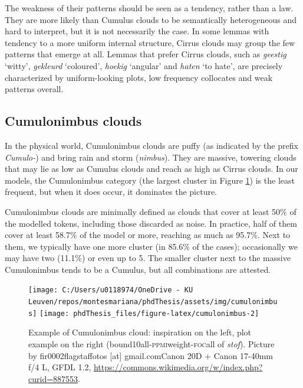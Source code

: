 \documentclass[
]{book}
\begin{document}
The weakness of their patterns should be seen as a tendency, rather than a law. They are more likely than Cumulus clouds to be semantically heterogeneous and hard to interpret, but it is not necessarily the case. In some lemmas with tendency to a more uniform internal structure, Cirrus clouds may group the few patterns that emerge at all.
Lemmas that prefer Cirrus clouds, such as \emph{geestig} `witty', \emph{gekleurd} `coloured', \emph{hoekig} `angular' and \emph{haten} `to hate', are precisely characterized by uniform-looking plots, low frequency collocates and weak patterns overall.

\hypertarget{cumulonimbus-clouds}{%
\subsection{Cumulonimbus clouds}\label{cumulonimbus-clouds}}

In the physical world, Cumulonimbus clouds are puffy (as indicated by the prefix \emph{Cumulo-}) and bring rain and storm (\emph{nimbus}). They are massive, towering clouds that may lie as low as Cumulus clouds and reach as high as Cirrus clouds. In our models, the Cumulonimbus category (the largest cluster in Figure \ref{fig:cumulonimbus}) is the least frequent, but when it does occur, it dominates the picture.

Cumulonimbus clouds are minimally defined as clouds that cover at least 50\% of the modelled tokens, including those discarded as noise. In practice, half of them cover at least 58.7\% of the model or more, reaching as much as 95.7\%.
Next to them, we typically have one more cluster (in 85.6\% of the cases);
occasionally we may have two (11.1\%) or even up to 5.
The smaller cluster next to the massive Cumulonimbus tends to be a Cumulus, but all combinations are attested.



\begin{figure}
\texttt{[image: C:/Users/u0118974/OneDrive - KU Leuven/repos/montesmariana/phdThesis/assets/img/cumulonimbus]} \texttt{[image: phdThesis\_files/figure-latex/cumulonimbus-2]} \caption{Example of Cumulonimbus cloud: inspiration on the left, plot example on the right (bound10all-\textsc{ppmi}weight-\textsc{foc}all of \emph{stof}). Picture by fir0002flagstaffotos {[}at{]} gmail.comCanon 20D + Canon 17-40mm f/4 L, GFDL 1.2, \url{https://commons.wikimedia.org/w/index.php?curid=887553}.}\label{fig:cumulonimbus}
\end{figure}
\end{document}
